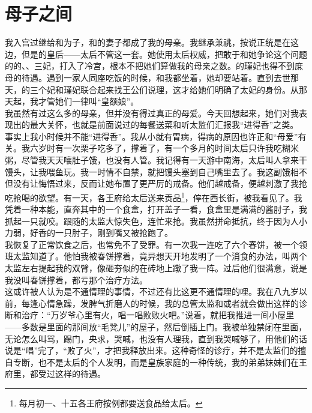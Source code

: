 \fancyhead[RO]{} %
\fancyhead[LE]{} %
\chapter*{母子之间}
\thispagestyle{empty}
我入宫过继给和为子，和的妻子都成了我的母亲。我继承兼祧，按说正统是在这边，但是的皇后——太后不管这一套。她使用太后权威，把敢于和她争论这个问题的的、、三妃，打入了冷宫，根本不把她们算做我的母亲之数。的瑾妃也得不到庶母的待遇。遇到一家人同座吃饭的时候，和我都坐着，她却要站着。直到去世那天，的三个妃和瑾妃联合起来找王公们说理，这才给她们明确了太妃的身份。从那天起，我才管她们一律叫“皇额娘”。\\

我虽然有过这么多的母亲，但并没有得过真正的母爱。今天回想起来，她们对我表现出的最大关怀，也就是前面说过的每餐送菜和听太监们汇报我“进得香”之类。\\

事实上我小时候并不能“进得香”。我从小就有胃病，得病的原因也许正和“母爱”有关。我六岁时有一次栗子吃多了，撑着了，有一个多月的时间太后只许我吃糊米粥，尽管我天天嚷肚子饿，也没有人管。我记得有一天游中南海，太后叫人拿来干馒头，让我喂鱼玩。我一时情不自禁，就把馒头塞到自己嘴里去了。我这副饿相不但没有让悔悟过来，反而让她布置了更严厉的戒备。他们越戒备，便越刺激了我抢吃抢喝的欲望。有一天，各王府给太后送来贡品\footnote{每月初一、十五各王府按例都要送食品给太后。}，停在西长街，被我看见了。我凭着一种本能，直奔其中的一个食盒，打开盖子一看，食盒里是满满的酱肘子，我抓起一只就咬。跟随的太监大惊失色，连忙来抢。我虽然拼命抵抗，终于因为人小力弱，好香的一只肘子，刚到嘴又被抢跑了。\\

我恢复了正常饮食之后，也常免不了受罪。有一次我一连吃了六个春饼，被一个领班太监知道了。他怕我被春饼撑着，竟异想天开地发明了一个消食的办法，叫两个太监左右提起我的双臂，像砸夯似的在砖地上蹾了我一阵。过后他们很满意，说是我没叫春饼撑着，都亏那个治疗方法。\\

这或许被人认为是不通情理的事情，不过还有比这更不通情理的哩。我在八九岁以前，每逢心情急躁，发脾气折磨人的时候，我的总管太监和或者就会做出这样的诊断和治疗：“万岁爷心里有火，唱一唱败败火吧。”说着，就把我推进一间小屋里——多数是里面的那间放“毛凳儿”的屋子，然后倒插上门。我被单独禁闭在里面，无论怎么叫骂，踢门，央求，哭喊，也没有人理我，直到我哭喊够了，用他们的话说是“唱”完了，“败了火”，才把我释放出来。这种奇怪的诊疗，并不是太监们的擅自专断，也不是太后的个人发明，而是皇族家庭的一种传统，我的弟弟妹妹们在王府里，都受过这样的待遇。\\

